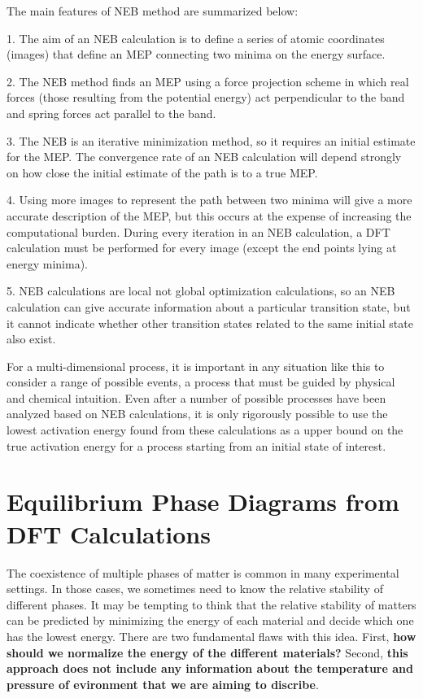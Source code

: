 \documentclass[12pt]{article}
\begin{document}
The main features of NEB method are summarized below:

1. The aim of an NEB calculation is to define a series of atomic coordinates (images) that define an MEP connecting two minima on the energy surface.

2. The NEB method finds an MEP using a force projection scheme in which real forces (those resulting from the potential energy) act perpendicular to the band and spring forces act parallel to the band.

3. The NEB is an iterative minimization method, so it requires an initial estimate for the MEP. The convergence rate of an NEB calculation will depend strongly on how close the initial estimate of the path is to a true MEP.

4. Using more images to represent the path between two minima will give a more accurate description of the MEP, but this occurs at the expense of increasing the computational burden. During every iteration in an NEB calculation, a DFT calculation must be performed for every image (except the end points lying at energy minima).

5. NEB calculations are local not global optimization calculations, so an NEB calculation can give accurate information about a particular transition state, but it cannot indicate whether other transition states related to the same initial state also exist.

For a multi-dimensional process, it is important in any situation like this to consider a range of possible events, a process that must be guided by physical and chemical intuition. Even after a number of possible processes have been analyzed based on NEB calculations, it is only rigorously possible to use the lowest activation energy found from these calculations as a upper bound on the true activation energy for a process starting from an initial state of interest.

\section{Equilibrium Phase Diagrams from DFT Calculations}
The coexistence of multiple phases of matter is common in many experimental settings. In those cases, we sometimes need to know the relative stability of different phases. It may be tempting to think that the relative stability of matters can be predicted by minimizing the energy of each material and decide which one has the lowest energy. There are two fundamental flaws with this idea. First, \textbf{how should we normalize the energy of the different materials?} Second, \textbf{this approach does not include any information about the temperature and pressure of evironment that we are aiming to discribe}.
\end{document}
